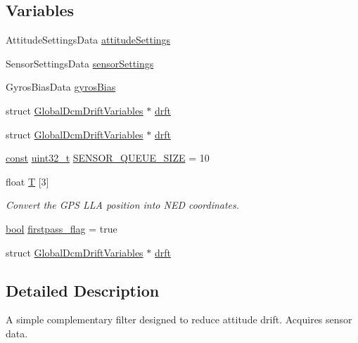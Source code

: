\subsection*{Variables}
\begin{DoxyCompactItemize}
\item 
Attitude\-Settings\-Data \hyperlink{group___attitude_ga8f6543ab52bafea6c0858baeeae8db59}{attitude\-Settings}
\item 
Sensor\-Settings\-Data \hyperlink{group___attitude_ga7e2b26cdc0322ab9457559aa2b94f8fc}{sensor\-Settings}
\item 
Gyros\-Bias\-Data \hyperlink{group___attitude_ga233a2d6850e9c466f80ae6bb2ebd98e8}{gyros\-Bias}
\item 
struct \hyperlink{struct_global_dcm_drift_variables}{Global\-Dcm\-Drift\-Variables} $\ast$ \hyperlink{group___attitude_ga89657be5e41cdb8b74d42e587333115a}{drft}
\item 
struct \hyperlink{struct_global_dcm_drift_variables}{Global\-Dcm\-Drift\-Variables} $\ast$ \hyperlink{group___attitude_ga89657be5e41cdb8b74d42e587333115a}{drft}
\item 
\hyperlink{group___n_a_m_e_ga7ae6d0e43244213b34de2c2b9aa30da6}{const} \hyperlink{stdint_8h_a435d1572bf3f880d55459d9805097f62}{uint32\-\_\-t} \hyperlink{group___attitude_ga5c62d2531c3e579a49d025858bd52a83}{S\-E\-N\-S\-O\-R\-\_\-\-Q\-U\-E\-U\-E\-\_\-\-S\-I\-Z\-E} = 10
\item 
float \hyperlink{group___attitude_ga62b409271acba166dbf31b4fed9af697}{T} \mbox{[}3\mbox{]}
\begin{DoxyCompactList}\small\item\em Convert the G\-P\-S L\-L\-A position into N\-E\-D coordinates. \end{DoxyCompactList}\item 
\hyperlink{group___exported__types_gaf6a258d8f3ee5206d682d799316314b1}{bool} \hyperlink{group___attitude_ga82c3e02e8def62d93a337dc338c4d6cd}{firstpass\-\_\-flag} = true
\item 
struct \hyperlink{struct_global_dcm_drift_variables}{Global\-Dcm\-Drift\-Variables} $\ast$ \hyperlink{group___attitude_ga89657be5e41cdb8b74d42e587333115a}{drft}
\end{DoxyCompactItemize}


\subsection{Detailed Description}
A simple complementary filter designed to reduce attitude drift. Acquires sensor data.

